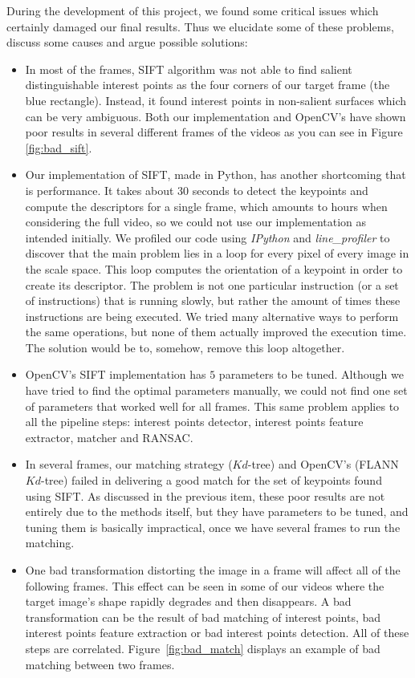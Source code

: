 \documentclass[]{IEEEtran}
\begin{document}
During the development of this project, we found some critical issues which certainly damaged our final results. Thus we elucidate some of these problems, discuss some causes and argue possible solutions:
\begin{itemize}
\item In most of the frames, SIFT algorithm was not able to find salient distinguishable interest points as the four corners of our target frame (the blue rectangle). Instead, it found interest points in non-salient surfaces which can be very ambiguous. Both our implementation and OpenCV's have shown poor results in several different frames of the videos as you can see in Figure \ref{fig:bad_sift}.
\item Our implementation of SIFT, made in Python, has another shortcoming that is performance. It takes about 30 seconds to detect the keypoints and compute the descriptors for a single frame, which amounts to hours when considering the full video, so we could not use our implementation as intended initially. We profiled our code using \textit{IPython} and \textit{line\_profiler} to discover that the main problem lies in a loop for every pixel of every image in the scale space. This loop computes the orientation of a keypoint in order to create its descriptor. The problem is not one particular instruction (or a set of instructions) that is running slowly, but rather the amount of times these instructions are being executed. We tried many alternative ways to perform the same operations, but none of them actually improved the execution time. The solution would be to, somehow, remove this loop altogether.
\item OpenCV's SIFT implementation has $5$ parameters to be tuned. Although we have tried to find the optimal parameters manually, we could not find one set of parameters that worked well for all frames. This same problem applies to all the pipeline steps: interest points detector, interest points feature extractor, matcher and RANSAC.
\item In several frames, our matching strategy ($Kd$-tree) and OpenCV's (FLANN $Kd$-tree) failed in delivering a good match for the set of keypoints found using SIFT. As discussed in the previous item, these poor results are not entirely due to the methods itself, but they have parameters to be tuned, and tuning them is basically impractical, once we have several frames to run the matching.
\item One bad transformation distorting the image in a frame will affect all of the following frames. This effect can be seen in some of our videos where the target image's shape rapidly degrades and then disappears. A bad transformation can be the result of bad matching of interest points, bad interest points feature extraction or bad interest points detection. All of these steps are correlated. Figure~\ref{fig:bad_match} displays an example of bad matching between two frames.

\end{itemize}
\end{document}
